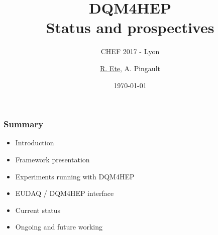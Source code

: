 \documentclass[presentation, 10pt]{beamer}
\title{DQM4HEP \\ Status and prospectives}
\subtitle{CHEF 2017 - Lyon}
\author[R. Ete]{\underline{R. Ete}, A. Pingault}
\institute{DESY}
\date{\today}
\begin{document}
\maketitle

\begin{frame}
  \frametitle{Summary}

  \begin{itemize}
    \item Introduction
    \item Framework presentation
    \item Experiments running with DQM4HEP
    \item EUDAQ / DQM4HEP interface
    \item Current status
    \item Ongoing and future working
  \end{itemize}
  
\end{frame}
\end{document}
